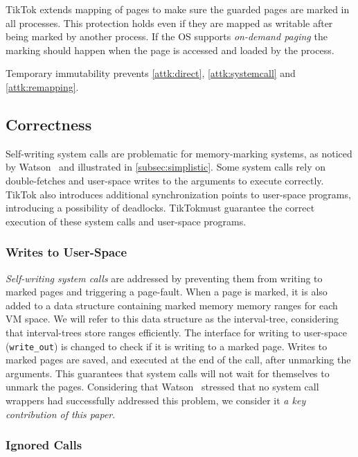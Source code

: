 \documentclass[conference]{IEEEtran}
\newcommand{\sysname}{TikTok}
\begin{document}
\sysname{} extends mapping of pages to make sure the guarded pages are marked in
all processes. This protection holds even if they are mapped as writable after
being marked by another process. If the OS supports \emph{on-demand paging} the
marking should happen when the page is accessed and loaded by the process.

Temporary immutability prevents \autoref{attk:direct}, \autoref{attk:systemcall}
and \autoref{attk:remapping}.

\subsection{Correctness}
\label{subsec:corectness}
Self-writing system calls are problematic for memory-marking systems, as noticed
by Watson~\cite{watson2007exploiting} and illustrated in
\autoref{subsec:simplistic}. Some system calls rely on double-fetches and
user-space writes to the arguments to execute correctly. \sysname{} also
introduces additional synchronization points to user-space programs, introducing
a possibility of deadlocks. \sysname must guarantee the correct execution of
these system calls and user-space programs.

\subsubsection{Writes to User-Space}

\emph{Self-writing system calls} are addressed by preventing them from writing
to marked pages and triggering a page-fault. When a page is marked, it is also
added to a data structure containing marked memory memory ranges for each VM
space. We will refer to this data structure as the interval-tree, considering
that interval-trees store ranges efficiently. The interface for writing to
user-space (\texttt{write\_out}) is changed to check if it is writing to a
marked page. Writes to marked pages are saved, and executed at the end of the
call, after unmarking the arguments. This guarantees that system calls will not
wait for themselves to unmark the pages. Considering that
Watson~\cite{watson2007exploiting} stressed that no system call wrappers had
successfully addressed this problem, we consider it \emph{a key contribution of
this paper}.

\subsubsection{Ignored Calls}
\end{document}
